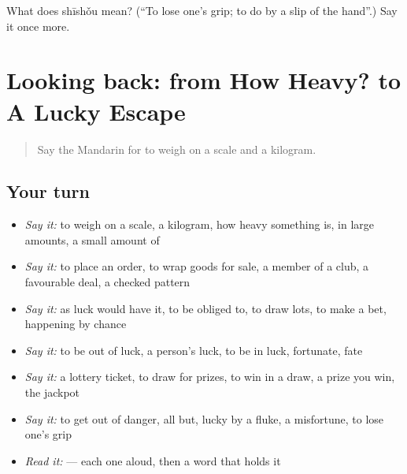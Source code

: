 \begin{tcolorbox}[breakable,colback=teal!4,colframe=teal!35!black,title={Before you move on}]
What does shīshǒu mean? (\textquotedblleft{}To lose one's grip; to do by a slip of the hand\textquotedblright{}.) Say it once more.
\end{tcolorbox}
\section[(dialogue)]{Looking back: from How Heavy? to A Lucky Escape}

\label{lesson:ZH-R531-review-526-531}



\begin{quote}
Say the Mandarin for to weigh on a scale and a kilogram.
\end{quote}

\subsection*{Your turn}
\begin{itemize}
\raggedright
  \item \emph{Say it:} to weigh on a scale, a kilogram, how heavy something is, in large amounts, a small amount of
  \item \emph{Say it:} to place an order, to wrap goods for sale, a member of a club, a favourable deal, a checked pattern
  \item \emph{Say it:} as luck would have it, to be obliged to, to draw lots, to make a bet, happening by chance
  \item \emph{Say it:} to be out of luck, a person's luck, to be in luck, fortunate, fate
  \item \emph{Say it:} a lottery ticket, to draw for prizes, to win in a draw, a prize you win, the jackpot
  \item \emph{Say it:} to get out of danger, all but, lucky by a fluke, a misfortune, to lose one's grip
  \item \emph{Read it:}   — each one aloud, then a word that holds it
\end{itemize}


